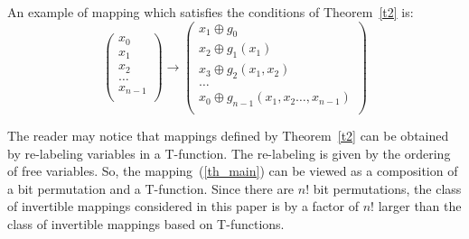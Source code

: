 \documentclass[9pt,conference]{IEEEtran} \usepackage{times}
\begin{document}
An example of mapping which satisfies the conditions of Theorem~\ref{t2} is: 
\begin{equation} \label{cons}
\left(
\begin{array}{l}
{x}_0 \\
{x}_1 \\
{x}_2 \\
\ldots \\
{x}_{n-1} \\
\end{array}
\right)
\rightarrow
\left(
\begin{array}{l}
x_1 \oplus g_0 \\
x_2 \oplus g_1(x_1) \\
x_3 \oplus g_2(x_1,x_2) \\
\ldots \\
x_0 \oplus g_{n-1}(x_1,x_2\ldots,x_{n-1}) \\
\end{array}
\right)
\end{equation}

The reader may notice that mappings defined by Theorem~\ref{t2}
can be obtained by re-labeling variables in a T-function.
The re-labeling is given by the ordering of free variables.
So, the mapping~(\ref{th_main}) can be viewed
as a composition of a bit permutation and a T-function.
Since there are $n!$ bit permutations, the class of invertible mappings considered in this paper is
by a factor of $n!$ larger than the class of invertible mappings 
based on T-functions.
\end{document}
